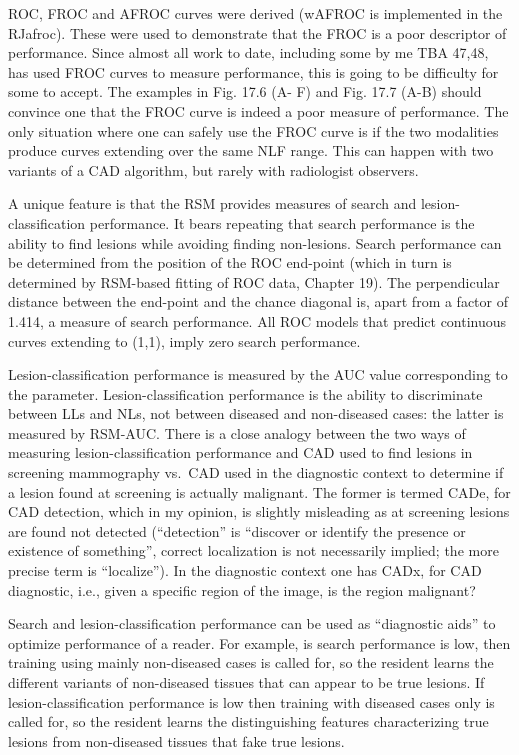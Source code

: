 \documentclass[
]{book}
\begin{document}
ROC, FROC and AFROC curves were derived (wAFROC is implemented in the RJafroc). These were used to demonstrate that the FROC is a poor descriptor of performance. Since almost all work to date, including some by me TBA 47,48, has used FROC curves to measure performance, this is going to be difficulty for some to accept. The examples in Fig. 17.6 (A- F) and Fig. 17.7 (A-B) should convince one that the FROC curve is indeed a poor measure of performance. The only situation where one can safely use the FROC curve is if the two modalities produce curves extending over the same NLF range. This can happen with two variants of a CAD algorithm, but rarely with radiologist observers.

A unique feature is that the RSM provides measures of search and lesion-classification performance. It bears repeating that search performance is the ability to find lesions while avoiding finding non-lesions. Search performance can be determined from the position of the ROC end-point (which in turn is determined by RSM-based fitting of ROC data, Chapter 19). The perpendicular distance between the end-point and the chance diagonal is, apart from a factor of 1.414, a measure of search performance. All ROC models that predict continuous curves extending to (1,1), imply zero search performance.

Lesion-classification performance is measured by the AUC value corresponding to the parameter. Lesion-classification performance is the ability to discriminate between LLs and NLs, not between diseased and non-diseased cases: the latter is measured by RSM-AUC. There is a close analogy between the two ways of measuring lesion-classification performance and CAD used to find lesions in screening mammography vs.~CAD used in the diagnostic context to determine if a lesion found at screening is actually malignant. The former is termed CADe, for CAD detection, which in my opinion, is slightly misleading as at screening lesions are found not detected (``detection'' is ``discover or identify the presence or existence of something'', correct localization is not necessarily implied; the more precise term is ``localize''). In the diagnostic context one has CADx, for CAD diagnostic, i.e., given a specific region of the image, is the region malignant?

Search and lesion-classification performance can be used as ``diagnostic aids'' to optimize performance of a reader. For example, is search performance is low, then training using mainly non-diseased cases is called for, so the resident learns the different variants of non-diseased tissues that can appear to be true lesions. If lesion-classification performance is low then training with diseased cases only is called for, so the resident learns the distinguishing features characterizing true lesions from non-diseased tissues that fake true lesions.
\end{document}
